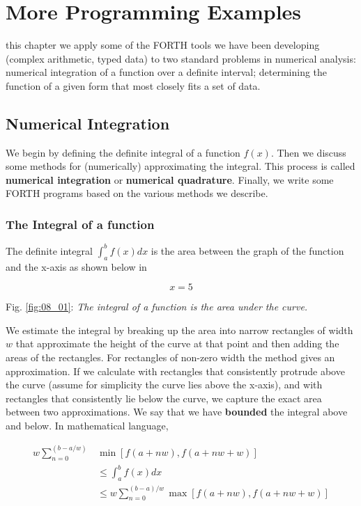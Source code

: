 
\chapter{More Programming Examples}

 this chapter we apply some of the FORTH tools we have been developing (complex arithmetic, typed data) to two standard problems in numerical analysis: numerical integration of a function over a definite interval; determining the function of a given form that most closely fits a set of data.

\section{Numerical Integration}
We begin by defining the definite integral of a function $f(x)$. Then we discuss some methods for (numerically) approximating the integral. This process is called \textbf{numerical integration} or \textbf{numerical quadrature}. Finally, we write some FORTH programs based on the various methods we describe.

\subsection{The Integral of a function}
The definite integral $\int_{a}^{b}f(x) dx$ is the area between the graph of the function and the x-axis as shown below in

\begin{equation} \label{fig:08_01}
x=5
\end{equation}

Fig. \ref{fig:08_01}: \textit{The integral of a function is the area under the curve.}

We estimate the integral by breaking up the area into narrow rectangles of width $w$ that approximate the height of the curve at that point and then adding the areas of the rectangles. For rectangles of non-zero width the method gives an approximation. If we calculate with rectangles that consistently protrude above the curve (assume for simplicity the curve lies above the x-axis), and with rectangles that consistently lie below the curve, we capture the exact area between two approximations. We say that we have \textbf{bounded} the integral above and below. In mathematical language,

\begin{equation}
    \begin{split}
    w \sum_{n=0}^{(b-a/w)} & \min[f(a+nw),f(a+nw+w)] \\
    & \leq \int_{a}^{b}f(x) dx \\
    & \leq w \sum_{n=0}^{(b-a)/w} \max[f(a+nw),f(a+nw+w)]
    \end{split}
\end{equation}

